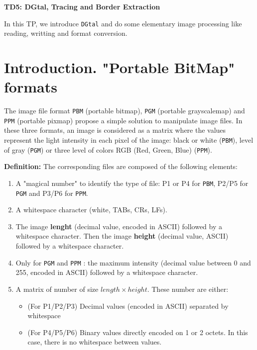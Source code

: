 \documentclass[a4paper, 11pt]{article}
\title{}
\author{}
\date{}
\begin{document}
\begin{center}
	\LARGE \textbf{TD5: DGtal, Tracing and Border Extraction}
\end{center}

\bigskip
\par In this TP, we introduce \texttt{DGtal} and do some elementary image processing like reading, writting and format conversion.

\section*{\bf Introduction. \rm "Portable BitMap" formats}

\par The image file format \texttt{PBM} (portable bitmap), \texttt{PGM} (portable grayscalemap) and \texttt{PPM} (portable pixmap) propose a simple solution to manipulate image files. In these three formats, an image is considered as a matrix where the values represent the light intensity in each pixel of the image: black or white (\texttt{PBM}), level of gray (\texttt{PGM}) or three level of colors RGB (Red, Green, Blue) (\texttt{PPM}).

\bigskip
\bigskip
\noindent \textbf{Definition:} The corresponding files are composed of the following elements:
\begin{enumerate}
	\item A "magical number" to identify the type of file: P1 or P4 for {\tt PBM}, P2/P5 for {\tt PGM} and P3/P6 for {\tt PPM}.
	\item A whitespace character (white, TABs, CRs, LFs).
	\item The image \textbf{lenght} (decimal value, encoded in ASCII) followed by a whitespace character. Then the image \textbf{height} (decimal value, ASCII) followed by a whitespace character.
	\item Only for {\tt PGM} and {\tt PPM} : the maximum intensity (decimal value between 0 and 255, encoded in ASCII) followed by a whitespace character.
	\item A matrix of number of size $length \times height$. These number are either:
	\begin{itemize}
		\item (For P1/P2/P3) Decimal values (encoded in ASCII) separated by whitespace
		\item (For P4/P5/P6) Binary values directly encoded on 1 or 2 octets. In this case, there is no whitespace between values.
	\end{itemize}
\end{enumerate}
\end{document}
